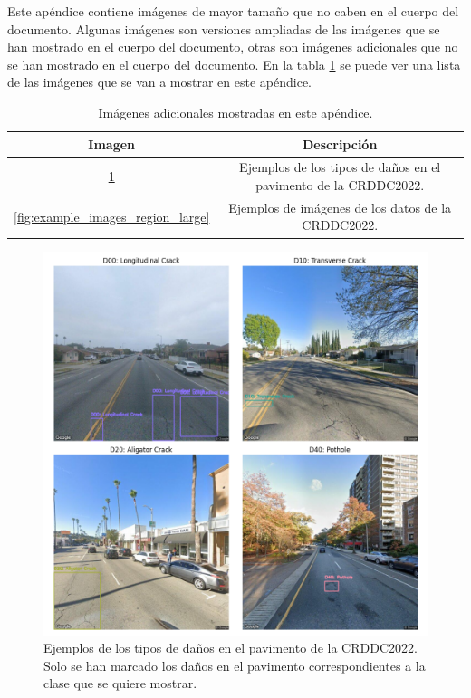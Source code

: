 
Este apéndice contiene imágenes de mayor tamaño que no caben en el cuerpo del documento. Algunas imágenes son versiones ampliadas de las imágenes que se han mostrado en el cuerpo del documento, otras son imágenes adicionales que no se han mostrado en el cuerpo del documento. En la tabla \ref{tab:larger_images} se puede ver una lista de las imágenes que se van a mostrar en este apéndice.

\begin{table}[H]
    \centering
    \begin{tabular}{|c|c|}
        \hline
        \textbf{Imagen} & \textbf{Descripción} \\ \hline
        \ref{fig:example_damage_types_large} & Ejemplos de los tipos de daños en el pavimento de la CRDDC2022. \\ \hline
        \ref{fig:example_images_region_large} & Ejemplos de imágenes de los datos de la CRDDC2022. \\ \hline
    \end{tabular}
    \caption{Imágenes adicionales mostradas en este apéndice.}
    \label{tab:larger_images}
\end{table}

\begin{figure}[H]
    \centering
    \includegraphics[width=\textwidth,height=\textheight,keepaspectratio]{img/example_damage_types_grid.png}
    \caption{Ejemplos de los tipos de daños en el pavimento de la CRDDC2022. Solo se han marcado los daños en el pavimento correspondientes a la clase que se quiere mostrar.}
    \label{fig:example_damage_types_large}
\end{figure}

